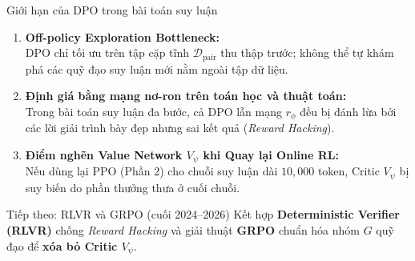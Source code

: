 \begin{frame}{Giới hạn của DPO trong bài toán suy luận}
  \small
  \begin{enumerate}\setlength{\itemsep}{2pt}
    \item \textbf{Off-policy Exploration Bottleneck:}\\
      \small DPO chỉ tối ưu trên tập cặp tĩnh $\mathcal{D}_{\text{pair}}$ thu thập trước; không thể tự khám phá các quỹ đạo suy luận mới nằm ngoài tập dữ liệu.
    \item \textbf{Định giá bằng mạng nơ-ron trên toán học và thuật toán:}\\
      \small Trong bài toán suy luận đa bước, cả DPO lẫn mạng $r_\phi$ đều bị đánh lừa bởi các lời giải trình bày đẹp nhưng sai kết quả (\textit{Reward Hacking}).
    \item \textbf{Điểm nghẽn Value Network $V_\psi$ khi Quay lại Online RL:}\\
      \small Nếu dùng lại PPO (Phần 2) cho chuỗi suy luận dài $10{,}000$ token, Critic $V_\psi$ bị suy biến do phần thưởng thưa ở cuối chuỗi.
  \end{enumerate}

  \vspace{0.06cm}
  \begin{exampleblock}{Tiếp theo: RLVR và GRPO (cuối 2024--2026)}
    \small
    Kết hợp \textbf{Deterministic Verifier (RLVR)} chống \textit{Reward Hacking} và giải thuật \textbf{GRPO} chuẩn hóa nhóm $G$ quỹ đạo để \textbf{xóa bỏ Critic $V_\psi$}.
  \end{exampleblock}
  \par\vspace{0pt}
\end{frame}
